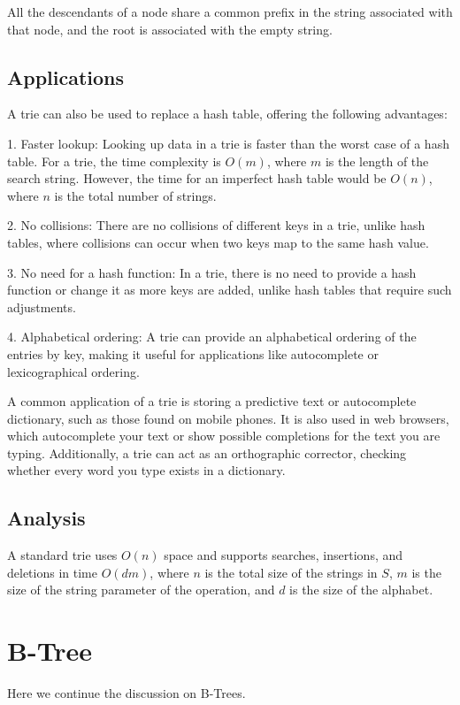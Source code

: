 All the descendants of a node share a common prefix in the string associated with that node, and the root is associated with the empty string.

\subsection{Applications}
A trie can also be used to replace a hash table, offering the following advantages:

1. Faster lookup: Looking up data in a trie is faster than the worst case of a hash table. For a trie, the time complexity is \(O(m)\), where \(m\) is the length of the search string. However, the time for an imperfect hash table would be \(O(n)\), where \(n\) is the total number of strings.

2. No collisions: There are no collisions of different keys in a trie, unlike hash tables, where collisions can occur when two keys map to the same hash value.

3. No need for a hash function: In a trie, there is no need to provide a hash function or change it as more keys are added, unlike hash tables that require such adjustments.

4. Alphabetical ordering: A trie can provide an alphabetical ordering of the entries by key, making it useful for applications like autocomplete or lexicographical ordering.

A common application of a trie is storing a predictive text or autocomplete dictionary, such as those found on mobile phones. It is also used in web browsers, which autocomplete your text or show possible completions for the text you are typing. Additionally, a trie can act as an orthographic corrector, checking whether every word you type exists in a dictionary.

\subsection{Analysis}
A standard trie uses \(O(n)\) space and supports searches, insertions, and deletions in time \(O(dm)\), where \(n\) is the total size of the strings in \(S\), \(m\) is the size of the string parameter of the operation, and \(d\) is the size of the alphabet.

\section{B-Tree}
Here we continue the discussion on B-Trees.  


